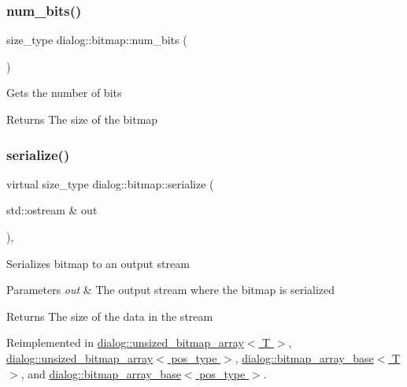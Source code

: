 \subsubsection{\texorpdfstring{num\+\_\+bits()}{num\_bits()}}
{\footnotesize\ttfamily size\+\_\+type dialog\+::bitmap\+::num\+\_\+bits (\begin{DoxyParamCaption}{ }\end{DoxyParamCaption})\hspace{0.3cm}{\ttfamily [inline]}}

Gets the number of bits \begin{DoxyReturn}{Returns}
The size of the bitmap 
\end{DoxyReturn}
\mbox{\label{classdialog_1_1bitmap_af93ff2660d3b790eee85692a41bdb823}} 
\subsubsection{\texorpdfstring{serialize()}{serialize()}}
{\footnotesize\ttfamily virtual size\+\_\+type dialog\+::bitmap\+::serialize (\begin{DoxyParamCaption}\item[{std\+::ostream \&}]{out }\end{DoxyParamCaption})\hspace{0.3cm}{\ttfamily [inline]}, {\ttfamily [virtual]}}

Serializes bitmap to an output stream 
\begin{DoxyParams}{Parameters}
{\em out} & The output stream where the bitmap is serialized \\
\hline
\end{DoxyParams}
\begin{DoxyReturn}{Returns}
The size of the data in the stream 
\end{DoxyReturn}


Reimplemented in \hyperlink{classdialog_1_1unsized__bitmap__array_a3c6dfec187c0ecad49d562c2b081ec6a}{dialog\+::unsized\+\_\+bitmap\+\_\+array$<$ T $>$}, \hyperlink{classdialog_1_1unsized__bitmap__array_a3c6dfec187c0ecad49d562c2b081ec6a}{dialog\+::unsized\+\_\+bitmap\+\_\+array$<$ pos\+\_\+type $>$}, \hyperlink{classdialog_1_1bitmap__array__base_aa7a0aa644a5a37eaf87a902a20cee939}{dialog\+::bitmap\+\_\+array\+\_\+base$<$ T $>$}, and \hyperlink{classdialog_1_1bitmap__array__base_aa7a0aa644a5a37eaf87a902a20cee939}{dialog\+::bitmap\+\_\+array\+\_\+base$<$ pos\+\_\+type $>$}.

